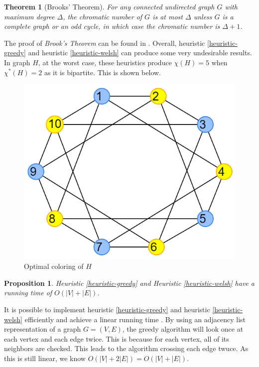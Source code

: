 \documentclass{article}
\newcounter{heuristic} \setcounter{heuristic}{0}
\newtheorem{prop}{Proposition}
\newtheorem{theorem}{Theorem}
\theoremstyle{definition}
\begin{document}
\begin{theorem}[Brooks' Theorem]
For any connected undirected graph \(G\) with maximum degree \(\Delta\), the chromatic number of \(G\) is at most \(\Delta\) unless \(G\) is a complete graph or an odd cycle, in which case the chromatic number is \(\Delta + 1\).
\end{theorem}

The proof of \emph{Brook's Theorem} can be found in \cite{lovasz}. Overall, heuristic \ref{heuristic-greedy} and heuristic \ref{heuristic-welsh} can produce some very undesirable results. In graph \(H\), at the worst case, these heuristics produce \(\chi(H) = 5\) when \(\chi^{*}(H) = 2\) as it is bipartite. This is shown below.

\begin{figure}[H]
\centering
\includegraphics[scale=0.38]{images/graph-6.png}
\caption{Optimal coloring of \(H\)}
\end{figure}

\begin{prop}
Heuristic \ref{heuristic-greedy} and Heuristic \ref{heuristic-welsh} have a running time of $O(|V| + |E|)$.
\end{prop}

It is possible to implement heuristic \ref{heuristic-greedy} and heuristic \ref{heuristic-welsh} efficiently and achieve a linear running time \cite{kubale}. By using an adjacency list representation of a graph \(G = (V, E)\), the greedy algorithm will look once at each vertex and each edge twice. This is because for each vertex, all of its neighbors are checked. This leads to the algorithm crossing each edge twuce. As this is still linear, we know \(O(|V| + 2|E|) = O(|V| + |E|)\).
\end{document}
